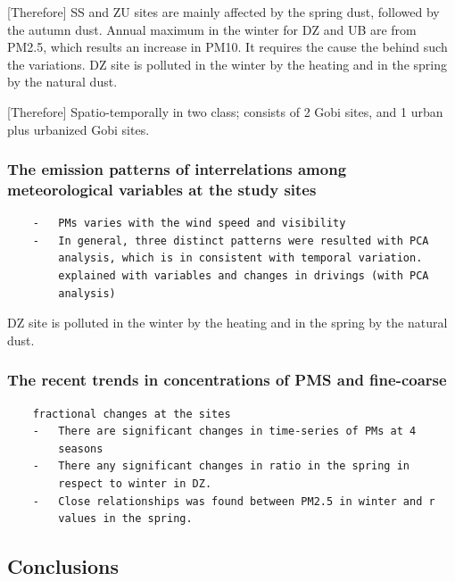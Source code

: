 \documentclass[
  11pt,
]{article}
\begin{document}
{[}Therefore{]} SS and ZU sites are mainly affected by the spring dust,
followed by the autumn dust. Annual maximum in the winter for DZ and UB
are from PM2.5, which results an increase in PM10. It requires the cause
the behind such the variations. DZ site is polluted in the winter by the
heating and in the spring by the natural dust.

{[}Therefore{]} Spatio-temporally in two class; consists of 2 Gobi
sites, and 1 urban plus urbanized Gobi sites.

\subsubsection{The emission patterns of interrelations among
meteorological variables at the study
sites}\label{the-emission-patterns-of-interrelations-among-meteorological-variables-at-the-study-sites}

\begin{verbatim}
    -   PMs varies with the wind speed and visibility
    -   In general, three distinct patterns were resulted with PCA
        analysis, which is in consistent with temporal variation.
        explained with variables and changes in drivings (with PCA
        analysis)
\end{verbatim}

DZ site is polluted in the winter by the heating and in the spring by
the natural dust.

\subsubsection{The recent trends in concentrations of PMS and
fine-coarse}\label{the-recent-trends-in-concentrations-of-pms-and-fine-coarse}

\begin{verbatim}
    fractional changes at the sites
    -   There are significant changes in time-series of PMs at 4
        seasons
    -   There any significant changes in ratio in the spring in
        respect to winter in DZ.
    -   Close relationships was found between PM2.5 in winter and r
        values in the spring.
\end{verbatim}

\subsection{Conclusions}\label{conclusions}
\end{document}

